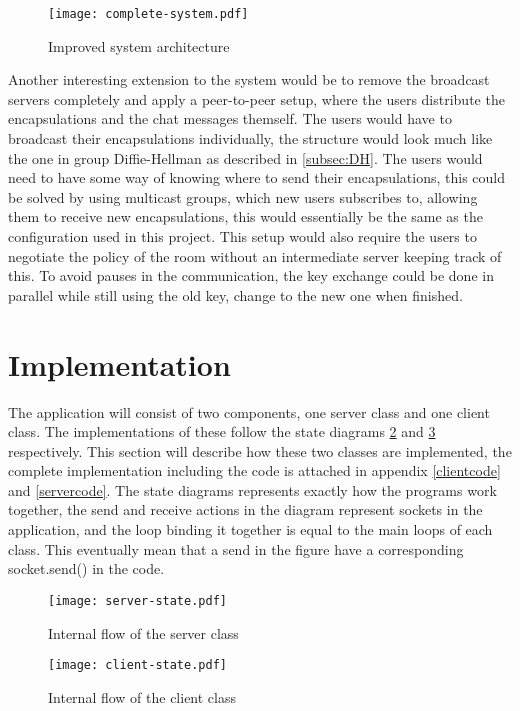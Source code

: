 \begin{figure}[h]
\centering
\texttt{[image: complete-system.pdf]}
\caption{Improved system architecture}
\label{fig:improved}
\end{figure}

Another interesting extension to the system would be to remove the broadcast servers completely and apply a peer-to-peer setup, where the users distribute the encapsulations and the chat messages themself. The users would have to broadcast their encapsulations individually, the structure would look much like the one in group Diffie-Hellman as described in \ref{subsec:DH}. The users would need to have some way of knowing where to send their encapsulations, this could be solved by using multicast groups, which new users subscribes to, allowing them to receive new encapsulations, this would essentially be the same as the configuration used in this project. This setup would also require the users to negotiate the policy of the room without an intermediate server keeping track of this. To avoid pauses in the communication, the key exchange could be done in parallel while still using the old key, change to the new one when finished. 




\section{Implementation}
The application will consist of two components, one server class and one client class. The implementations of these follow the state diagrams \ref{fig:server-state} and \ref{fig:client-state} respectively. This section will describe how these two classes are implemented, the complete implementation including the code is attached in appendix \ref{clientcode} and \ref{servercode}. The state diagrams represents exactly how the programs work together, the send and receive actions in the diagram represent sockets in the application, and the loop binding it together is equal to the main loops of each class. This eventually mean that a send in the figure have a corresponding socket.send() in the code.

\begin{figure}[H]
\centering
\texttt{[image: server-state.pdf]}
\caption{Internal flow of the server class}
\label{fig:server-state}
\end{figure}


\begin{figure}[H]
\centering
\texttt{[image: client-state.pdf]}
\caption{Internal flow of the client class}
\label{fig:client-state}
\end{figure}

